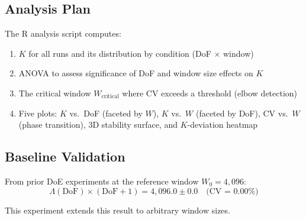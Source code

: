 \subsection{Analysis Plan}

The R analysis script computes:

\begin{enumerate}
  \item $K$ for all runs and its distribution by condition (DoF $\times$ window)
  \item ANOVA to assess significance of DoF and window size effects on $K$
  \item The critical window $W_\text{critical}$ where CV exceeds a threshold
        (elbow detection)
  \item Five plots: $K$ vs.\ DoF (faceted by $W$), $K$ vs.\ $W$ (faceted
        by DoF), CV vs.\ $W$ (phase transition), 3D stability surface,
        and $K$-deviation heatmap
\end{enumerate}

\subsection{Baseline Validation}

From prior DoE experiments at the reference window $W_0 = 4{,}096$:
\[
  \Lambda(\mathrm{DoF}) \times (\mathrm{DoF}+1) = 4{,}096.0 \pm 0.0
  \quad \text{(CV = 0.00\%)}
\]

This experiment extends this result to arbitrary window sizes.
